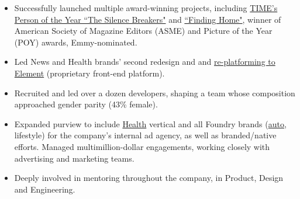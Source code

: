 \documentclass[a4paper,10pt]{memoir} %
\begin{document}
\userinformation %

\framebreak %









\begin{itemize}
	\item Successfully launched multiple award-winning projects, including  \href{http://time.com/time-person-of-the-year-2017-silence-breakers/}{TIME's Person of the Year ``The Silence Breakers"} and \href{http://time.com/finding-home/}{``Finding Home"}, winner of American Society of Magazine Editors (ASME) and Picture of the Year (POY) awards, Emmy-nominated.
	\item Led News and Health brands' second redesign and and \href{https://medium.com/@acharalambides/element-the-digital-unification-of-time-inc-979656149fd3}{re-platforming to Element} (proprietary front-end platform).
	\item Recruited and led over a dozen developers, shaping a team whose composition approached gender parity (43\% female).
	\item Expanded purview to include \href{http://www.health.com}{Health} vertical and all Foundry brands (\href{http://thedrive.com}{auto}, lifestyle) for the company's internal ad agency, as well as branded/native efforts. Managed multimillion-dollar engagements, working closely with advertising and marketing teams.
	\item Deeply involved in mentoring throughout the company, in Product, Design and Engineering. 
\end{itemize}
\Sep %
\end{document}
